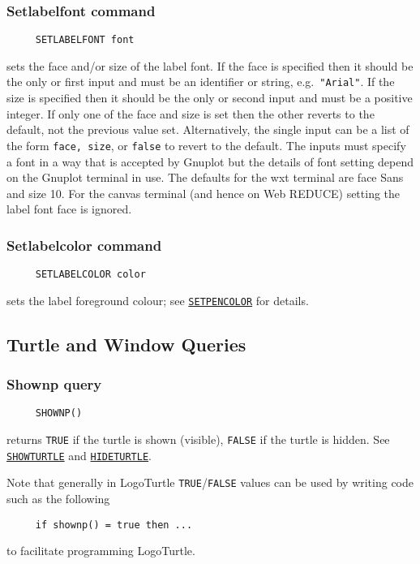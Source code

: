 \subsubsection*{Setlabelfont command}
\begin{verbatim}
     SETLABELFONT font
\end{verbatim}
\label{logoturtle:setlabelfont}
sets the face and/or size of the label font.  If the face is specified
then it should be the only or first input and must be an identifier or
string, e.g.\ \texttt{"Arial"}.  If the size is specified then it
should be the only or second input and must be a positive integer.  If
only one of the face and size is set then the other reverts to the
default, not the previous value set.  Alternatively, the single input
can be a list of the form \texttt{{face, size}}, or \texttt{false} to
revert to the default.  The inputs must specify a font in a way that
is accepted by Gnuplot but the details of font setting depend on the
Gnuplot terminal in use.  The defaults for the wxt terminal are face
Sans and size 10.  For the canvas terminal (and hence on Web REDUCE)
setting the label font face is ignored.

\subsubsection*{Setlabelcolor command}
\begin{verbatim}
     SETLABELCOLOR color
\end{verbatim}
sets the label foreground colour; see
\hyperref[logoturtle:setpencolor]{\texttt{SETPENCOLOR}} for details.


\subsection{Turtle and Window Queries}

\subsubsection*{Shownp query}
\begin{verbatim}
     SHOWNP()
\end{verbatim}
returns \texttt{TRUE} if the turtle is shown (visible), \texttt{FALSE}
if the turtle is hidden.  See
\hyperref[logoturtle:showturtle]{\texttt{SHOWTURTLE}} and
\hyperref[logoturtle:hideturtle]{\texttt{HIDETURTLE}}.

Note that generally in LogoTurtle \texttt{TRUE}/\texttt{FALSE} values
can be used by writing code such as the following
\begin{verbatim}
     if shownp() = true then ...
\end{verbatim}
to facilitate programming LogoTurtle.

